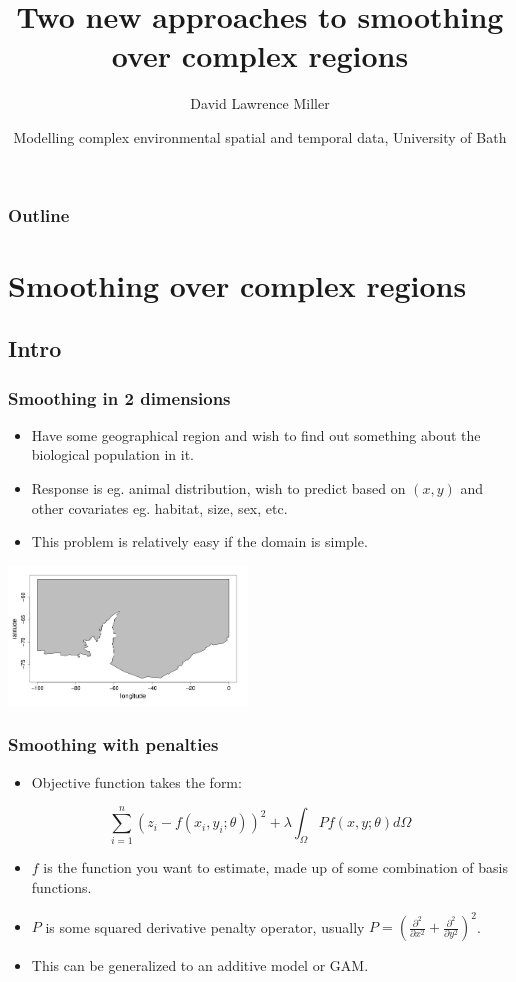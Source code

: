 \documentclass[ignorenonframetext]{beamer} %
\title[Smoothing over complex regions]{Two new approaches to smoothing over complex regions}
\author[Miller]{David Lawrence Miller}
\institute{Mathematical Sciences\\University of Bath}
\date[23-25 June 2009] {Modelling complex environmental spatial and temporal data, University of Bath}
\newcommand{\bc}{\begin{center}}
\newcommand{\ec}{\end{center}}
\newcommand{\bi}{\begin{itemize}}
\newcommand{\ei}{\end{itemize}}
\begin{document}
\begin{frame}
  \titlepage
\end{frame}


 {
\begin{frame}
  \frametitle{Outline}
  \tableofcontents %
\end{frame}
}

\section{Smoothing over complex regions}

\subsection{Intro}

\begin{frame}
	\frametitle{Smoothing in 2 dimensions}
       \bi
         \item Have some geographical region and wish to find out something about the biological population in it. 
         \item Response is eg. animal distribution, wish to predict based on $(x,y)$ and other covariates eg. habitat, size, sex, etc.
         \item This problem is relatively easy if the domain is simple.
       \ei
       \bc
         \includegraphics[width=2.5in]{figs/peninsula}
       \ec
\end{frame}

\begin{frame}
	\frametitle{Smoothing with penalties}
      \bi
         \item Objective function takes the form:
      \ei
      \bc
      \begin{equation*}
      \sum_{i=1}^n (z_i-f(x_i,y_i;\theta))^2 + \lambda \int_\Omega Pf(x,y;\theta)d\Omega
      \end{equation*}
      \ec
      \bi
         \item $f$ is the function you want to estimate, made up of some combination of basis functions.
         \item $P$ is some squared derivative penalty operator, usually $P=(\frac{\partial^2}{\partial x^2}+\frac{\partial^2}{\partial y^2})^2$.
         \item This can be generalized to an additive model or GAM.
      \ei
\end{frame}
\end{document}
